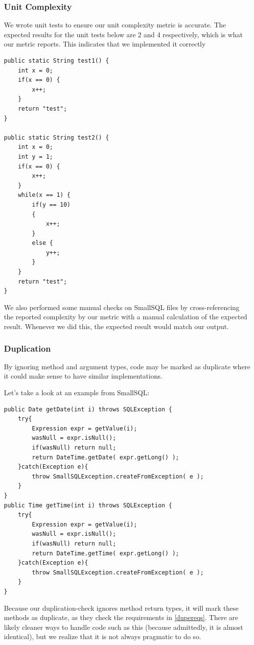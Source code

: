 \documentclass{article}
\begin{document}
\subsubsection{Unit Complexity}
We wrote unit tests to ensure our unit complexity metric is accurate. The expected results for the unit tests below are 2 and 4 respectively, which is what our metric reports. This indicates that we implemented it correctly

\begin{lstlisting}
public static String test1() {
	int x = 0;
	if(x == 0) {
		x++;
	}
	return "test";
}

public static String test2() {
	int x = 0;
	int y = 1;
	if(x == 0) {
		x++;
	}
	while(x == 1) {
		if(y == 10)
		{
			x++;
		}
		else {
			y++;
		}
	}
	return "test";
}
\end{lstlisting}

We also performed some manual checks on SmallSQL files by cross-referencing the reported complexity by our metric with a manual calculation of the expected result. Whenever we did this, the expected result would match our output.

\subsubsection{Duplication}
By ignoring method and argument types, code may be marked as duplicate where it could make sense to have similar implementations.

Let's take a look at an example from SmallSQL:

\begin{lstlisting}
public Date getDate(int i) throws SQLException {
    try{
		Expression expr = getValue(i);
        wasNull = expr.isNull();
		if(wasNull) return null;
		return DateTime.getDate( expr.getLong() );
    }catch(Exception e){
        throw SmallSQLException.createFromException( e );
    }
}
public Time getTime(int i) throws SQLException {
    try{
		Expression expr = getValue(i);
        wasNull = expr.isNull();
		if(wasNull) return null;
		return DateTime.getTime( expr.getLong() );
    }catch(Exception e){
        throw SmallSQLException.createFromException( e );
    }
}
\end{lstlisting}

Because our duplication-check ignores method return types, it will mark these methods as duplicate, as they check the requirements in \ref{dupereqs}. 
There are likely cleaner ways to handle code such as this (because admittedly, it is almost identical), but we realize that it is not always pragmatic to do so. 
\end{document}

